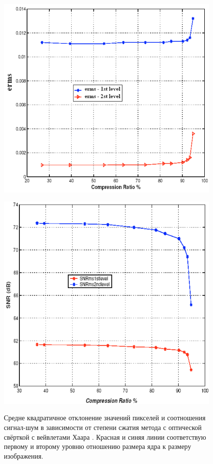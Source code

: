 \begin{figure}[h]
	\centering
		\begin{minipage}{.40\textwidth}
			\includegraphics[width=\linewidth]{figures/VLCERMS.png}
			\label{ris:VLCERMS}
		\end{minipage}
		\hfill
		\begin{minipage}{.40\textwidth}
			\includegraphics[width=0.95\linewidth]{figures/VLCSNR.png}
			\label{ris:VLCSNR}
		\end{minipage}
		\caption{Средне квадратичное отклонение значений пикселей и соотношения сигнал-шум в зависимости от степени сжатия метода с оптической свёрткой с вейвлетами Хаара \cite{alkholidi2008real}. Красная и синяя линии соответствую первому и второму уровню отношению размера ядра к размеру изображения.}
		\label{ris:VLCERMSSNR}
\end{figure}


